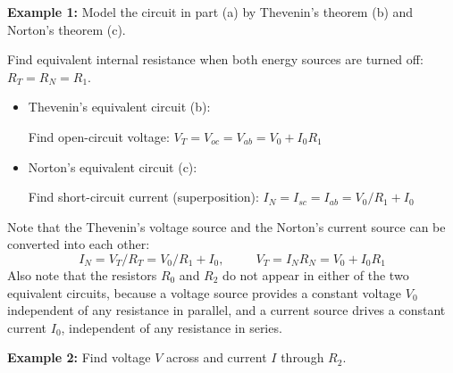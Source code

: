 \documentclass{article}
\begin{document}
{\bf Example 1:} Model the circuit in part (a) by Thevenin's theorem (b)
and Norton's theorem (c).


Find equivalent internal resistance when both energy sources
are turned off: $R_T=R_N=R_1$.

\begin{itemize}
\item Thevenin's equivalent circuit (b):

  Find open-circuit voltage: $V_T=V_{oc}=V_{ab}=V_0+I_0R_1$
\item Norton's equivalent circuit (c):

  Find short-circuit current (superposition):
  $I_N=I_{sc}=I_{ab}=V_0/R_1+I_0$
\end{itemize}
Note that the Thevenin's voltage source and the Norton's current 
source can be converted into each other:
  \begin{equation} 
    I_N=V_T/R_T=V_0/R_1+I_0,\;\;\;\;\;\;\;\;\;
    V_T=I_N R_N=V_0+I_0R_1	
  \end{equation}
Also note that the resistors $R_0$ and $R_2$ do not appear in either of
the two equivalent circuits, because a voltage source provides a constant
voltage $V_0$ independent of any resistance in parallel, and a current 
source drives a constant current $I_0$, independent of any resistance 
in series. 

{\bf Example 2:} Find voltage $V$ across and current $I$ through $R_2$.

\end{document}
